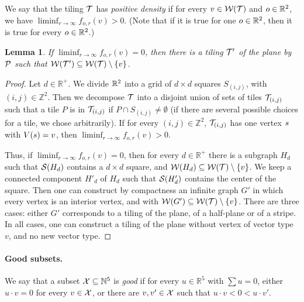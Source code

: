 \documentclass[11pt]{article}
\newtheorem{lemma}[theorem]{Lemma}
\theoremstyle{definition}
\begin{document}
We say that the tiling $\mathcal{T}$ has \emph{positive density} if for every $v\in \mathcal{W}(\mathcal{T})$ and $o\in\mathbb{R}^2$, we have $\liminf_{r\to\infty} f_{o,r}(v) > 0$.
(Note that if it is true for one $o\in\mathbb{R}^2$, then it is true for every $o\in\mathbb{R}^2$.)

\begin{lemma}\label{lemma:positivedensity}
If $\liminf_{r\to\infty} f_{o,r}(v) = 0$, then there is a tiling $\mathcal{T}'$ of the plane by $\mathcal{P}$ such that $\mathcal{W}(\mathcal{T}')\subseteq\mathcal{W}(\mathcal{T})\setminus\{v\}$. %
\end{lemma}
\begin{proof}
%
  Let $d\in \mathbb{R}^+$. We divide $\mathbb{R}^2$ into a grid of $d\times d$ squares $S_{(i,j)}$, with $(i,j)\in\mathbb{Z}^2$. Then we decompose $\mathcal{T}$ into a disjoint union of sets of tiles $\mathcal{T}_{(i,j)}$ such that a tile $P$ is in $\mathcal{T}_{(i,j)}$ if $P\cap S_{(i,j)} \ne \emptyset$ (if there are several possible choices for a tile, we chose arbitrarily). If for every $(i,j)\in \mathbb{Z}^2$, $\mathcal{T}_{(i,j)}$ has one vertex $s$ with $V(s)=v$, then $\liminf_{r\to\infty} f_{o,r}(v) > 0$. %

Thus, if $\liminf_{r\to\infty} f_{o,r}(v) = 0$, then for every $d\in\mathbb{R}^+$ there is a subgraph $H_d$ such that $\mathcal{S}(H_d)$ contains a $d\times d$ square, and $\mathcal{W}(H_d)\subseteq\mathcal{W}(\mathcal{T})\setminus\{v\}$.
We keep a connected component $H'_d$ of $H_d$ such that $\mathcal{S}(H'_d)$ contains the center of the square.
Then one can construct by compactness an infinite graph $G'$ in which every vertex is an interior vertex, and with $\mathcal{W}(G')\subseteq\mathcal{W}(\mathcal{T})\setminus\{v\}$.
There are three cases: either $G'$ corresponds to a tiling of the plane, of a half-plane or of a stripe. In all cases, one can construct a tiling of the plane without vertex of vector type $v$, and no new vector type.
%
%
%
%
%
%
%
%
%
%
%
%
%
\end{proof}

%

%

\paragraph{Good subsets.} %
We say that a subset $\mathcal{X}\subseteq \mathbb{N}^5$ is \emph{good} if for every $u\in \mathbb{R}^5$ with $\sum u=0$, either $u\cdot v=0$ for every $v\in \mathcal{X}$, or there are $v,v'\in \mathcal{X}$ such that $u\cdot v<0<u\cdot v'$.
%
\end{document}
